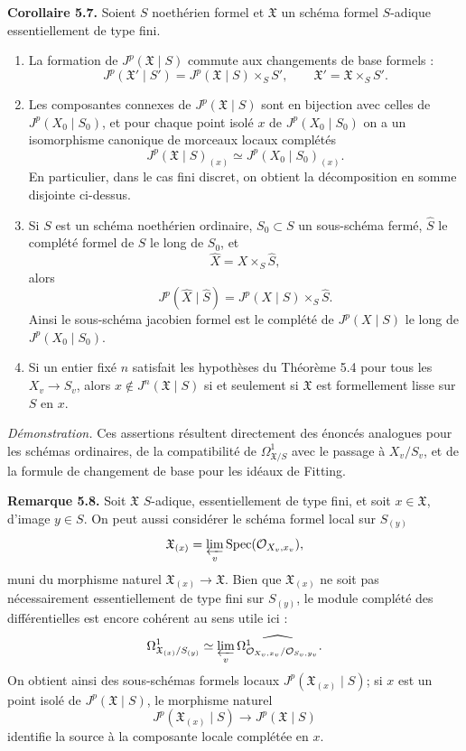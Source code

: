 \documentclass[11pt]{article}
\providecommand{\Spec}{\operatorname{Spec}}
\begin{document}
\textbf{Corollaire 5.7.}  Soient \(S\) noethérien formel et \(\mathfrak X\) un schéma formel \(S\)-adique essentiellement de type fini.
\begin{enumerate}[label=(\arabic*)]
\item La formation de \(J^p(\mathfrak X\mid S)\) commute aux changements de base formels :
\[
        J^p(\mathfrak X'\mid S')=
        J^p(\mathfrak X\mid S)\times_S S',
        \qquad \mathfrak X'=\mathfrak X\times_S S'.
\]
\item Les composantes connexes de \(J^p(\mathfrak X\mid S)\) sont en bijection avec celles de \(J^p(X_0\mid S_0)\), et pour chaque point isolé \(x\) de \(J^p(X_0\mid S_0)\) on a un isomorphisme canonique de morceaux locaux complétés
\[
        J^p(\mathfrak X\mid S)_{(x)}
        \simeq
        J^p(X_0\mid S_0)_{(x)} .
\]
En particulier, dans le cas fini discret, on obtient la décomposition en somme disjointe ci-dessus.
\item Si \(S\) est un schéma noethérien ordinaire, \(S_0\subset S\) un sous-schéma fermé, \(\widehat S\) le complété formel de \(S\) le long de \(S_0\), et
\[
        \widehat X=X\times_S\widehat S,
\]
alors
\[
        J^p(\widehat X\mid \widehat S)
        =
        J^p(X\mid S)\times_S \widehat S.
\]
Ainsi le sous-schéma jacobien formel est le complété de \(J^p(X\mid S)\) le long de \(J^p(X_0\mid S_0)\).
\item Si un entier fixé \(n\) satisfait les hypothèses du Théorème 5.4 pour tous les \(X_v\to S_v\), alors \(x\notin J^n(\mathfrak X\mid S)\) si et seulement si \(\mathfrak X\) est formellement lisse sur \(S\) en \(x\).
\end{enumerate}

\emph{Démonstration.}  Ces assertions résultent directement des énoncés analogues pour les schémas ordinaires, de la compatibilité de \(\Omega^1_{\mathfrak X/S}\) avec le passage à \(X_v/S_v\), et de la formule de changement de base pour les idéaux de Fitting.

\textbf{Remarque 5.8.}  Soit \(\mathfrak X\) \(S\)-adique, essentiellement de type fini, et soit \(x\in\mathfrak X\), d'image \(y\in S\).  On peut aussi considérer le schéma formel local sur \(S_{(y)}\)
\[
        \mathfrak X_{(x)}=\varprojlim_v \Spec(\Oo_{X_v,x_v}),
\]
muni du morphisme naturel \(\mathfrak X_{(x)}\to\mathfrak X\).  Bien que \(\mathfrak X_{(x)}\) ne soit pas nécessairement essentiellement de type fini sur \(S_{(y)}\), le module complété des différentielles est encore cohérent au sens utile ici :
\[
        \Omega^1_{\mathfrak X_{(x)}/S_{(y)}}
        \simeq
        \varprojlim_v \widehat{\Omega^1_{\mathcal O_{X_v,x_v}/\mathcal O_{S_v,y_v}}}.
\]
On obtient ainsi des sous-schémas formels locaux \(J^p(\mathfrak X_{(x)}\mid S)\); si \(x\) est un point isolé de \(J^p(\mathfrak X\mid S)\), le morphisme naturel
\[
        J^p(\mathfrak X_{(x)}\mid S)\longrightarrow J^p(\mathfrak X\mid S)
\]
identifie la source à la composante locale complétée en \(x\).
\end{document}
